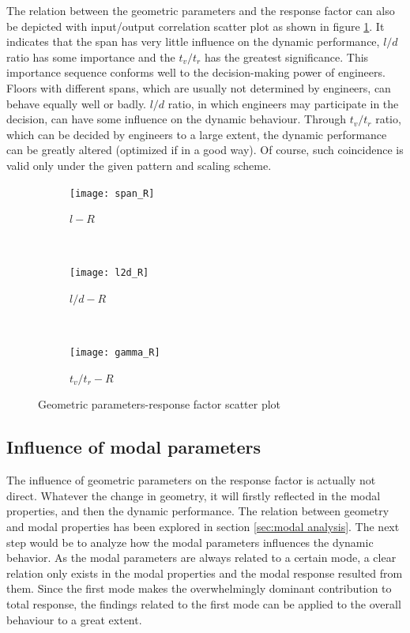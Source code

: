 The relation between the geometric parameters and the response factor can also be depicted with input/output correlation scatter plot as shown in figure \ref{fig:geom-R_scatter}. It indicates that the span has very little influence on the dynamic performance, $l/d$ ratio has some importance and the $t_v/t_r$ has the greatest significance. This importance sequence conforms well to the decision-making power of engineers. Floors with different spans, which are usually not determined by engineers, can behave equally well or badly. $l/d$ ratio, in which engineers may participate in the decision, can have some influence on the dynamic behaviour. Through $t_v/t_r$ ratio, which can be decided by engineers to a large extent, the dynamic performance can be greatly altered (optimized if in a good way). Of course, such coincidence is valid only under the given pattern and scaling scheme.

\begin{figure}[H]
\begin{subfigure}[b]{.32\textwidth}
  \centering
  \texttt{[image: span\_R]}
  \caption{$l-R$}
\end{subfigure}
~
\begin{subfigure}[b]{.32\textwidth}
  \centering
  \texttt{[image: l2d\_R]}
  \caption{$l/d-R$}
\end{subfigure}
~
\begin{subfigure}[b]{.32\textwidth}
  \centering
  \texttt{[image: gamma\_R]}
  \caption{$t_v/t_r-R$}
\end{subfigure}

\caption{Geometric parameters-response factor scatter plot}
\label{fig:geom-R_scatter}
\end{figure}


\subsection{Influence of modal parameters}
\label{subsec:influence of modal parameters}
The influence of geometric parameters on the response factor is actually not direct. Whatever the change in geometry, it will firstly reflected in the modal properties, and then the dynamic performance. The relation between geometry and modal properties has been explored in section \ref{sec:modal analysis}. The next step would be to analyze how the modal parameters influences the dynamic behavior. As the modal parameters are always related to a certain mode, a clear relation only exists in the modal properties and the modal response resulted from them. Since the first mode makes the overwhelmingly dominant contribution to total response, the findings related to the first mode can be applied to the overall behaviour to a great extent.

